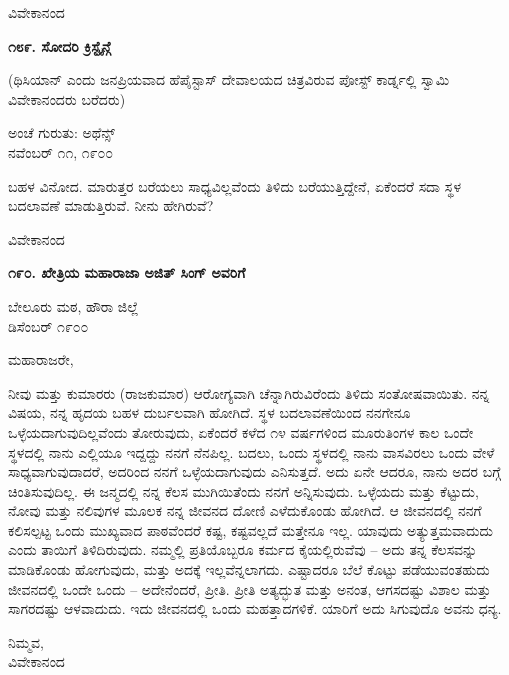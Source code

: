 \begin{flushright}
ವಿವೇಕಾನಂದ
\end{flushright}

\begin{center}
\textbf{೧೮೯. ಸೋದರಿ ಕ್ರಿಸ್ಟೈನ್ಗೆ}
\end{center}

(ಥಿಸಿಯಾನ್ ಎಂದು ಜನಪ್ರಿಯವಾದ ಹೆಪೈಸ್ಟಾಸ್ ದೇವಾಲಯದ ಚಿತ್ರವಿರುವ ಪೋಸ್ಟ್ ಕಾರ್ಡ್ನಲ್ಲಿ ಸ್ವಾಮಿ ವಿವೇಕಾನಂದರು ಬರೆದರು)

\begin{flushright}
ಅಂಚೆ ಗುರುತು: ಅಥೆನ್ಸ್\\ನವೆಂಬರ್ ೧೧, ೧೯೦೦
\end{flushright}

ಬಹಳ ವಿನೋದ. ಮಾರುತ್ತರ ಬರೆಯಲು ಸಾಧ್ಯವಿಲ್ಲವೆಂದು ತಿಳಿದು ಬರೆಯುತ್ತಿದ್ದೇನೆ, ಏಕೆಂದರೆ ಸದಾ ಸ್ಥಳ ಬದಲಾವಣೆ ಮಾಡುತ್ತಿರುವೆ. ನೀನು ಹೇಗಿರುವೆ?

\begin{flushright}
ವಿವೇಕಾನಂದ
\end{flushright}

\begin{center}
\textbf{೧೯೦. ಖೇತ್ರಿಯ ಮಹಾರಾಜಾ ಅಜಿತ್ ಸಿಂಗ್ ಅವರಿಗೆ}
\end{center}

\begin{flushright}
ಬೇಲೂರು ಮಠ, ಹೌರಾ ಜಿಲ್ಲೆ\\ಡಿಸೆಂಬರ್ ೧೯೦೦
\end{flushright}

ಮಹಾರಾಜರೇ,

ನೀವು ಮತ್ತು ಕುಮಾರರು (ರಾಜಕುಮಾರ) ಆರೋಗ್ಯವಾಗಿ ಚೆನ್ನಾಗಿರುವಿರೆಂದು ತಿಳಿದು ಸಂತೋಷವಾಯಿತು. ನನ್ನ ವಿಷಯ, ನನ್ನ ಹೃದಯ ಬಹಳ ದುರ್ಬಲವಾಗಿ ಹೋಗಿದೆ. ಸ್ಥಳ ಬದಲಾವಣೆಯಿಂದ ನನಗೇನೂ ಒಳ್ಳೆಯದಾಗುವುದಿಲ್ಲವೆಂದು ತೋರುವುದು, ಏಕೆಂದರೆ ಕಳೆದ ೧೪ ವರ್ಷಗಳಿಂದ ಮೂರುತಿಂಗಳ ಕಾಲ ಒಂದೇ ಸ್ಥಳದಲ್ಲಿ ನಾನು ಎಲ್ಲಿಯೂ ಇದ್ದದ್ದು ನನಗೆ ನೆನಪಿಲ್ಲ. ಬದಲು, ಒಂದು ಸ್ಥಳದಲ್ಲಿ ನಾನು ವಾಸವಿರಲು ಒಂದು ವೇಳೆ ಸಾಧ್ಯವಾಗುವುದಾದರೆ, ಅದರಿಂದ ನನಗೆ ಒಳ್ಳೆಯದಾಗುವುದು ಎನಿಸುತ್ತದೆ. ಅದು ಏನೇ ಆದರೂ, ನಾನು ಅದರ ಬಗ್ಗೆ ಚಿಂತಿಸುವುದಿಲ್ಲ. ಈ ಜನ್ಮದಲ್ಲಿ ನನ್ನ ಕೆಲಸ ಮುಗಿಯಿತೆಂದು ನನಗೆ ಅನ್ನಿಸುವುದು. ಒಳ್ಳೆಯದು ಮತ್ತು ಕೆಟ್ಟುದು, ನೋವು ಮತ್ತು ನಲಿವುಗಳ ಮೂಲಕ ನನ್ನ ಜೀವನದ ದೋಣಿ ಎಳೆದುಕೊಂಡು ಹೋಗಿದೆ. ಆ ಜೀವನದಲ್ಲಿ ನನಗೆ ಕಲಿಸಲ್ಪಟ್ಟ ಒಂದು ಮುಖ್ಯವಾದ ಪಾಠವೆಂದರೆ ಕಷ್ಟ, ಕಷ್ಟವಲ್ಲದೆ ಮತ್ತೇನೂ ಇಲ್ಲ. ಯಾವುದು ಅತ್ಯುತ್ತಮವಾದುದು ಎಂದು ತಾಯಿಗೆ ತಿಳಿದಿರುವುದು. ನಮ್ಮಲ್ಲಿ ಪ್ರತಿಯೊಬ್ಬರೂ ಕರ್ಮದ ಕೈಯಲ್ಲಿರುವೆವು – ಅದು ತನ್ನ ಕೆಲಸವನ್ನು ಮಾಡಿಕೊಂಡು ಹೋಗುವುದು, ಮತ್ತು ಅದಕ್ಕೆ ಇಲ್ಲವೆನ್ನಲಾಗದು. ಎಷ್ಟಾದರೂ ಬೆಲೆ ಕೊಟ್ಟು ಪಡೆಯುವಂತಹುದು ಜೀವನದಲ್ಲಿ ಒಂದೇ ಒಂದು – ಅದೇನೆಂದರೆ, ಪ್ರೀತಿ. ಪ್ರೀತಿ ಅತ್ಯದ್ಭುತ ಮತ್ತು ಅನಂತ, ಆಗಸದಷ್ಟು ವಿಶಾಲ ಮತ್ತು ಸಾಗರದಷ್ಟು ಆಳವಾದುದು. ಇದು ಜೀವನದಲ್ಲಿ ಒಂದು ಮಹತ್ತಾದಗಳಿಕೆ. ಯಾರಿಗೆ ಅದು ಸಿಗುವುದೊ ಅವನು ಧನ್ಯ.

\begin{flushright}
ನಿಮ್ಮವ,\\ವಿವೇಕಾನಂದ
\end{flushright}

